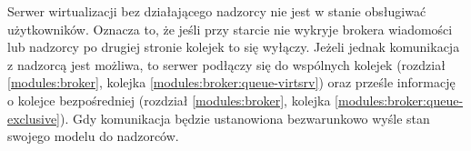 \documentclass[../opis-rozwiazania.tex]{subfiles}
\begin{document}
Serwer wirtualizacji bez działającego nadzorcy nie jest w stanie obsługiwać użytkowników.
Oznacza to, że jeśli przy starcie nie wykryje brokera wiadomości
lub nadzorcy po drugiej stronie kolejek \parencite{rabbit-ack} to się wyłączy.
Jeżeli jednak komunikacja z nadzorcą jest możliwa, to serwer podłączy się do wspólnych kolejek (rozdział \ref{modules:broker}, kolejka \ref{modules:broker:queue-virtsrv})
oraz prześle informację o kolejce bezpośredniej (rozdział \ref{modules:broker}, kolejka \ref{modules:broker:queue-exclusive}).
Gdy komunikacja będzie ustanowiona bezwarunkowo wyśle stan swojego modelu do nadzorców.
\end{document}
